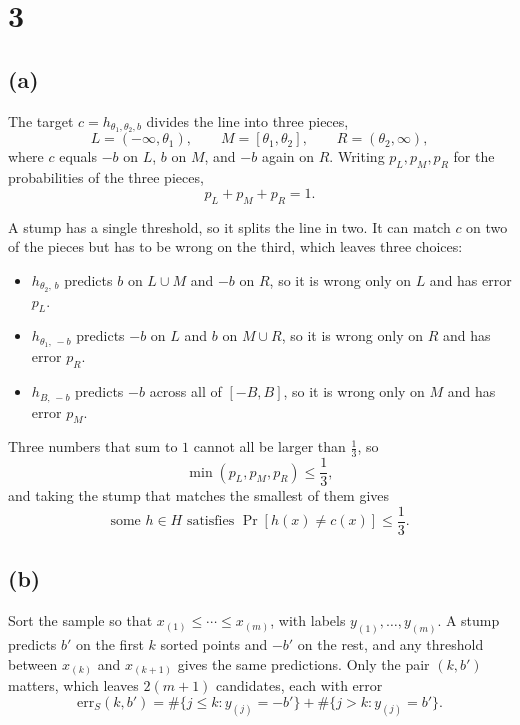 \documentclass[11pt]{article}
\begin{document}
\section*{3}

\subsection*{(a)}

The target \(c=h_{\theta_1,\theta_2,b}\) divides the line into three pieces,
\[
L=(-\infty,\theta_1),
\qquad
M=[\theta_1,\theta_2],
\qquad
R=(\theta_2,\infty),
\]
where \(c\) equals \(-b\) on \(L\), \(b\) on \(M\), and \(-b\) again on
\(R\). Writing \(p_L,p_M,p_R\) for the probabilities of the three pieces,
\[
p_L+p_M+p_R=1 .
\]

A stump has a single threshold, so it splits the line in two. It can match
\(c\) on two of the pieces but has to be wrong on the third, which leaves
three choices:
\begin{itemize}[leftmargin=*,itemsep=2pt]
    \item \(h_{\theta_2,\,b}\) predicts \(b\) on \(L\cup M\) and \(-b\) on
    \(R\), so it is wrong only on \(L\) and has error \(p_L\).
    \item \(h_{\theta_1,\,-b}\) predicts \(-b\) on \(L\) and \(b\) on
    \(M\cup R\), so it is wrong only on \(R\) and has error \(p_R\).
    \item \(h_{B,\,-b}\) predicts \(-b\) across all of \([-B,B]\), so it is
    wrong only on \(M\) and has error \(p_M\).
\end{itemize}

Three numbers that sum to \(1\) cannot all be larger than \(\frac13\), so
\[
\min(p_L,p_M,p_R)\le\frac13 ,
\]
and taking the stump that matches the smallest of them gives
\[
\boxed{
\text{some } h\in H \text{ satisfies }
\Pr[h(x)\neq c(x)]\le\frac13 .
}
\]

\subsection*{(b)}

Sort the sample so that \(x_{(1)}\le\cdots\le x_{(m)}\), with labels
\(y_{(1)},\ldots,y_{(m)}\). A stump predicts \(b'\) on the first \(k\) sorted
points and \(-b'\) on the rest, and any threshold between \(x_{(k)}\) and
\(x_{(k+1)}\) gives the same predictions. Only the pair \((k,b')\) matters,
which leaves \(2(m+1)\) candidates, each with error
\[
\mathrm{err}_S(k,b')
=
\#\{j\le k:y_{(j)}=-b'\}
+
\#\{j>k:y_{(j)}=b'\} .
\]
\end{document}
